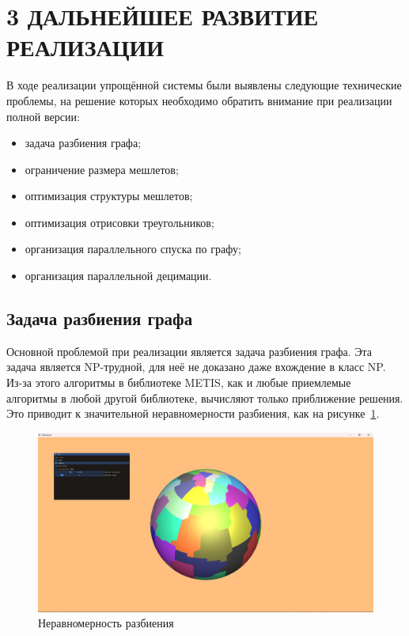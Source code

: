 \clearpage
\section{3 ДАЛЬНЕЙШЕЕ РАЗВИТИЕ РЕАЛИЗАЦИИ}
В ходе реализации упрощённой системы были выявлены следующие технические проблемы, на решение которых необходимо обратить внимание при реализации полной версии:
\begin{itemize}
    \item задача разбиения графа;
    \item ограничение размера мешлетов;
    \item оптимизация структуры мешлетов;
    \item оптимизация отрисовки треугольников;
    \item организация параллельного спуска по графу;
    \item организация параллельной децимации.
\end{itemize}

\subsection*{Задача разбиения графа}
Основной проблемой при реализации является задача разбиения графа.
Эта задача является NP-трудной, для неё не доказано даже вхождение в класс NP.
Из-за этого алгоритмы в библиотеке METIS, как и любые приемлемые алгоритмы в любой другой библиотеке, вычисляют только приближение решения.
Это приводит к значительной неравномерности разбиения, как на рисунке~\ref{fig:sphere-0}.
\begin{figure}[H]
    \centering
    \includegraphics[width=\textwidth]{pics/sphere0.png}
    \caption{Неравномерность разбиения}
    \label{fig:sphere-0}
\end{figure}

